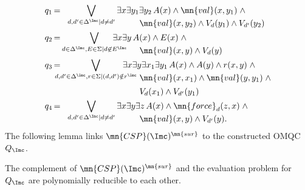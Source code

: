 \documentclass{lmcs}
\theoremstyle{definition}
\begin{document}
$$
\begin{array}{r@{\,}c@{\,}l}
  q_1  &=& \,\,\,\,\displaystyle\bigvee_{d,d' \in \Delta^\Imc \mid d \neq d'}
  \exists x \exists y_1 \exists y_2 \, A(x) \wedge \mn{val}(x,y_1) \;
  \wedge  \\[-3mm]
  && \hspace*{3.2cm}  \mn{val}(x,y_2) \wedge V_d(y_1) \wedge V_{d'}(y_2) \\[1mm]
   q_2  &=&  
   \displaystyle\bigvee_{d \in \Delta^\Imc, E \in
   	\Sigma \mid d\not\in E^\Imc} \!\!\!\!\!\!\!\!\!\!\!
   \exists x\exists
   y \, A(x) \wedge E(x) \; \wedge
   \\[-3mm]
   && \hspace*{3.2cm} \mn{val}(x,y) \wedge V_d(y) \\[1mm]
  q_3  &=&  \!\!\!\!\!\displaystyle\bigvee_{d,d' \in \Delta^\Imc, r \in
    \Sigma \mid (d,d') \notin r^\Imc} \!\!\!\!\!\!\!\!\!\!\!
  \exists x\exists
  y\exists x_1  \exists y_1 \,  A(x) \wedge A(y) \wedge r(x,y) \;
  \wedge \\[-3mm]
  && \hspace*{3.2cm} \mn{val}(x,x_1) \wedge \mn{val}(y,y_1) \; \wedge
  \\[1.5mm]
  && \hspace*{3.2cm}V_d(x_1) \wedge V_{d'}(y_1) \\[1mm]
  q_4 &=&  \,\,\,\,\displaystyle \bigvee_{d,d' \in \Delta^\Imc \mid d \neq d'}
  \exists x \exists y \exists z \, A(x) \wedge \mn{force}_d(z,x) \;
  \wedge \\[-3mm]
  && \hspace*{3.2cm} \mn{val}(x,y) \wedge V_{d'}(y).
\end{array}
$$
%
The following lemma links $\mn{CSP}(\Imc)^{\mn{sur}}$ to the
constructed OMQC $Q_{\Imc}$.
%
\begin{lem}\label{lem:comp-csp-reduc-to-omqc}
The complement of $\mn{CSP}(\Imc)^{\mn{sur}}$ and the evaluation problem for $Q_{\Imc}$ 
are polynomially reducible to each other. 
\end{lem}
%
\end{document}
